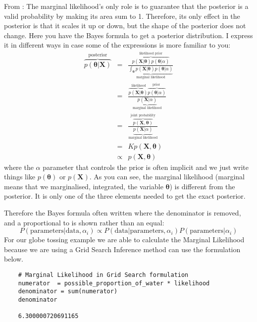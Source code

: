 From \cite{Quoramarginallikelihoodandposterior2019}:
The marginal likelihood's only role is to guarantee that the posterior is a valid probability by making its area sum to 1.
Therefore, its only effect in the posterior is that it scales it up or down, but the shape of the posterior does not change.
Here you have the Bayes formula to get a posterior distribution. I express it in different ways in case some of the expressions is more familiar to you:
\begin{eqnarray}
\overbrace{p(\boldsymbol{\theta} | \mathbf{X})}^{\text { posterior }}
&=&
\frac{\overbrace{p(\mathbf{X} | \boldsymbol{\theta}) p(\boldsymbol{\theta} | \alpha)}^{\text { likelihood prior }}}
{
    \underbrace{ \int_{\boldsymbol{\theta}} p(\mathbf{X} | \boldsymbol{\theta}) p(\boldsymbol{\theta} | \alpha)}_{\text { marginal likelihood }}
    }\nonumber\\
&=& \frac{
    \overbrace{p(\mathbf{X} | \boldsymbol{\theta})}^{\text { likelihood}}
    \overbrace{p(\boldsymbol{\theta} | \alpha)}^{\text {prior }}
    }{
        \underbrace{p(\mathbf{X} | \alpha)}_{\text { marginal likelihood }}
        }\nonumber\\
&=&\frac{\overbrace{p(\mathbf{X}, \boldsymbol{\theta})}^{\text { joint probability }}}
{
    \underbrace{p(\mathbf{X} | \alpha)}_{\textrm{marginal likelihood}}
    }
\nonumber\\
&=&K p(\mathbf{X}, \boldsymbol{\theta}) \nonumber\\
&\propto& p(\mathbf{X}, \boldsymbol{\theta})\nonumber
\end{eqnarray}
where the $\alpha$ parameter that controls the prior is often implicit and we just write things like $p(\boldsymbol{\theta})$  or $p(\mathbf{X})$. As you can see, the marginal likelihood (marginal means that we marginalised, integrated, the variable $\boldsymbol{\theta}$) is different from the posterior. It is only one of the three elements needed to get the exact posterior.



Therefore the  Bayes formula often written where the denominator is removed, and a proportional to is shown rather than an equal:
\begin{equation*}
    P(\textrm{parameters}|\textrm{data},\alpha_i) \propto
    P(\textrm{data}|\textrm{parameters},\alpha_i)P(\textrm{parameters}|\alpha_i)
\end{equation*}
For our globe tossing example we are able to calculate the Marginal Likelihood because we are using a Grid Search Inference method can use the formulation below.
\begin{lstlisting}
    # Marginal Likelihood in Grid Search formulation
    numerator  = possible_proportion_of_water * likelihood
    denominator = sum(numerator)
    denominator
    
    6.300000720691165
    
\end{lstlisting}

